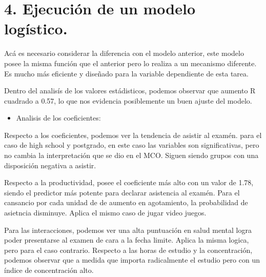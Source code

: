 \documentclass[11pt]{article}
\providecommand{\tightlist}{%
      \setlength{\itemsep}{0pt}\setlength{\parskip}{0pt}}
\begin{document}
    \section{4. Ejecución de un modelo
logístico.}\label{ejecuciuxf3n-de-un-modelo-loguxedstico.}

Acá es necesario considerar la diferencia con el modelo anterior, este
modelo posee la misma función que el anterior pero lo realiza a un
mecanismo diferente. Es mucho más eficiente y diseñado para la variable
dependiente de esta tarea.

Dentro del analisís de los valores estádisticos, podemos observar que
aumento R cuadrado a 0.57, lo que nos evidencia posiblemente un buen
ajuste del modelo.

\begin{itemize}
\tightlist
\item
  Analisis de los coeficientes:
\end{itemize}

Respecto a los coeficientes, podemos ver la tendencia de asistir al
examén. para el caso de high school y postgrado, en este caso las
variables son significativas, pero no cambia la interpretación que se
dio en el MCO. Siguen siendo grupos con una disposición negativa a
asistir.

Respecto a la productividad, posee el coeficiente más alto con un valor
de 1.78, siendo el predictor más potente para declarar asistencia al
examén. Para el cansancio por cada unidad de de aumento en agotamiento,
la probabilidad de asietncia disminuye. Aplica el mismo caso de jugar
video juegos.

Para las interacciones, podemos ver una alta puntuación en salud mental
logra poder presentarse al examen de cara a la fecha limite. Aplica la
misma logica, pero para el caso contrario. Respecto a las horas de
estudio y la concentración, podemos observar que a medida que importa
radicalmente el estudio pero con un índice de concentración alto.
\end{document}
